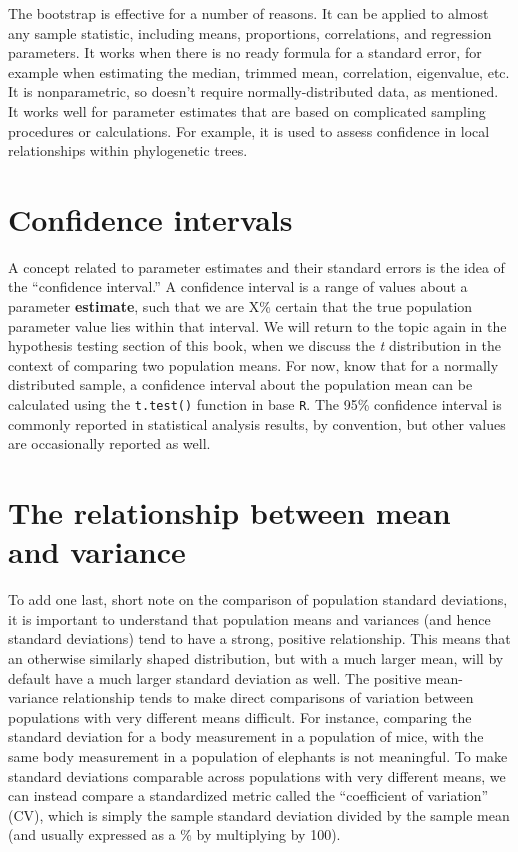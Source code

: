 \documentclass[]{book}
\begin{document}
The bootstrap is effective for a number of reasons. It can be applied to almost any sample statistic, including means, proportions, correlations, and regression parameters. It works when there is no ready formula for a standard error, for example when estimating the median, trimmed mean, correlation, eigenvalue, etc. It is nonparametric, so doesn't require normally-distributed data, as mentioned. It works well for parameter estimates that are based on complicated sampling procedures or calculations. For example, it is used to assess confidence in local relationships within phylogenetic trees.

\hypertarget{confidence-intervals}{%
\section{Confidence intervals}\label{confidence-intervals}}

A concept related to parameter estimates and their standard errors is the idea of the ``confidence interval.'' A confidence interval is a range of values about a parameter \textbf{estimate}, such that we are X\% certain that the true population parameter value lies within that interval. We will return to the topic again in the hypothesis testing section of this book, when we discuss the \emph{t} distribution in the context of comparing two population means. For now, know that for a normally distributed sample, a confidence interval about the population mean can be calculated using the \texttt{t.test()} function in base \texttt{R}. The 95\% confidence interval is commonly reported in statistical analysis results, by convention, but other values are occasionally reported as well.

\hypertarget{the-relationship-between-mean-and-variance}{%
\section{The relationship between mean and variance}\label{the-relationship-between-mean-and-variance}}

To add one last, short note on the comparison of population standard deviations, it is important to understand that population means and variances (and hence standard deviations) tend to have a strong, positive relationship. This means that an otherwise similarly shaped distribution, but with a much larger mean, will by default have a much larger standard deviation as well. The positive mean-variance relationship tends to make direct comparisons of variation between populations with very different means difficult. For instance, comparing the standard deviation for a body measurement in a population of mice, with the same body measurement in a population of elephants is not meaningful. To make standard deviations comparable across populations with very different means, we can instead compare a standardized metric called the ``coefficient of variation'' (CV), which is simply the sample standard deviation divided by the sample mean (and usually expressed as a \% by multiplying by 100).
\end{document}
